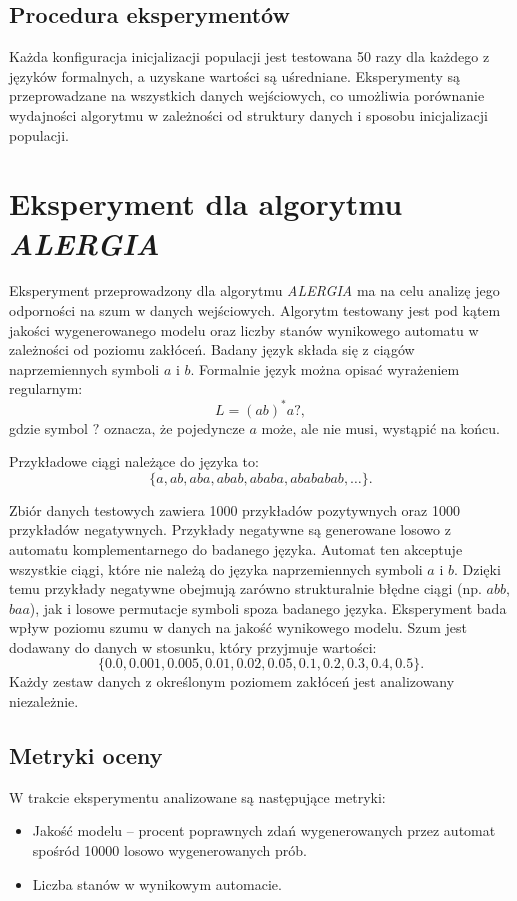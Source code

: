 \subsection{Procedura eksperymentów}  
Każda konfiguracja inicjalizacji populacji jest testowana 50 razy dla każdego z języków formalnych, a uzyskane wartości są uśredniane. Eksperymenty są przeprowadzane na wszystkich danych wejściowych, co umożliwia porównanie wydajności algorytmu w zależności od struktury danych i sposobu inicjalizacji populacji.  


\section{Eksperyment dla algorytmu \textit{ALERGIA}}  
Eksperyment przeprowadzony dla algorytmu \textit{ALERGIA} ma na celu analizę jego odporności na szum w danych wejściowych. Algorytm testowany jest pod kątem jakości wygenerowanego modelu oraz liczby stanów wynikowego automatu w zależności od poziomu zakłóceń. Badany język składa się z ciągów naprzemiennych symboli \( a \) i \( b \). Formalnie język można opisać wyrażeniem regularnym:  
\[
L = (ab)^* a?,
\]  
gdzie symbol \( ? \) oznacza, że pojedyncze \( a \) może, ale nie musi, wystąpić na końcu.  

Przykładowe ciągi należące do języka to:  
\[
\{a, ab, aba, abab, ababa, abababab, \ldots\}.
\]  

Zbiór danych testowych zawiera 1000 przykładów pozytywnych oraz 1000 przykładów negatywnych. Przykłady negatywne są generowane losowo z automatu komplementarnego do badanego języka. Automat ten akceptuje wszystkie ciągi, które nie należą do języka naprzemiennych symboli \( a \) i \( b \). Dzięki temu przykłady negatywne obejmują zarówno strukturalnie błędne ciągi (np. \( abb \), \( baa \)), jak i losowe permutacje symboli spoza badanego języka. Eksperyment bada wpływ poziomu szumu w danych na jakość wynikowego modelu. Szum jest dodawany do danych w stosunku, który przyjmuje wartości:  
\[
\{\num{0.0}, \num{0.001}, \num{0.005}, \num{0.01}, \num{0.02}, \num{0.05}, \num{0.1}, \num{0.2}, \num{0.3}, \num{0.4}, \num{0.5}\}.
\]  
Każdy zestaw danych z określonym poziomem zakłóceń jest analizowany niezależnie.  

\subsection{Metryki oceny}  
W trakcie eksperymentu analizowane są następujące metryki:  
\begin{itemize}  
    \item Jakość modelu -- procent poprawnych zdań wygenerowanych przez automat spośród \num{10000} losowo wygenerowanych prób.  
    \item Liczba stanów w wynikowym automacie.  
\end{itemize}  

